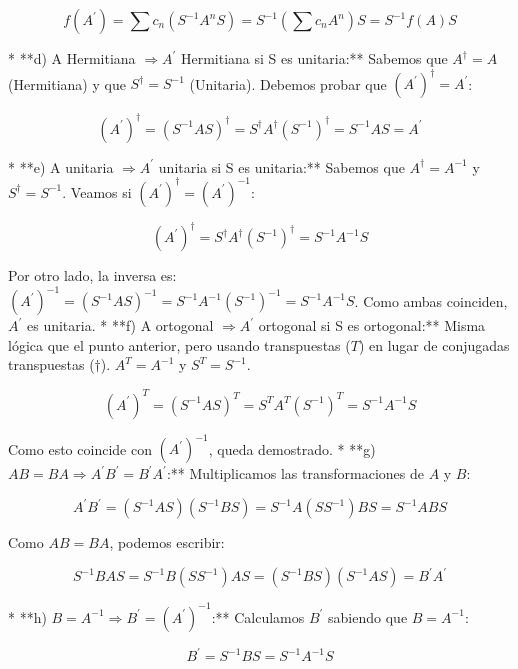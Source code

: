 \documentclass[11pt,spanish]{article}
\begin{document}
$$f(A^{\prime}) = \sum c_n (S^{-1} A^n S) = S^{-1} \left( \sum c_n A^n \right) S = S^{-1} f(A) S$$


* 
**d) A Hermitiana $\Rightarrow A^{\prime}$ Hermitiana si S es unitaria:** 
Sabemos que $A^{\dagger} = A$ (Hermitiana) y que $S^{\dagger} = S^{-1}$ (Unitaria). Debemos probar que $(A^{\prime})^{\dagger} = A^{\prime}$:



$$(A^{\prime})^{\dagger} = (S^{-1} A S)^{\dagger} = S^{\dagger} A^{\dagger} (S^{-1})^{\dagger} = S^{-1} A S = A^{\prime}$$


* 
**e) A unitaria $\Rightarrow A^{\prime}$ unitaria si S es unitaria:** 
Sabemos que $A^{\dagger} = A^{-1}$ y $S^{\dagger} = S^{-1}$. Veamos si $(A^{\prime})^{\dagger} = (A^{\prime})^{-1}$:



$$(A^{\prime})^{\dagger} = S^{\dagger} A^{\dagger} (S^{-1})^{\dagger} = S^{-1} A^{-1} S$$



Por otro lado, la inversa es: $(A^{\prime})^{-1} = (S^{-1} A S)^{-1} = S^{-1} A^{-1} (S^{-1})^{-1} = S^{-1} A^{-1} S$. Como ambas coinciden, $A^{\prime}$ es unitaria.
* 
**f) A ortogonal $\Rightarrow A^{\prime}$ ortogonal si S es ortogonal:** 
Misma lógica que el punto anterior, pero usando transpuestas ($T$) en lugar de conjugadas transpuestas ($\dagger$). $A^T = A^{-1}$ y $S^T = S^{-1}$.



$$(A^{\prime})^T = (S^{-1} A S)^T = S^T A^T (S^{-1})^T = S^{-1} A^{-1} S$$



Como esto coincide con $(A^{\prime})^{-1}$, queda demostrado.
* 
**g) $AB = BA \Rightarrow A^{\prime}B^{\prime} = B^{\prime}A^{\prime}$:** 
Multiplicamos las transformaciones de $A$ y $B$:



$$A^{\prime}B^{\prime} = (S^{-1} A S) (S^{-1} B S) = S^{-1} A (S S^{-1}) B S = S^{-1} A B S$$



Como $AB = BA$, podemos escribir:

$$S^{-1} B A S = S^{-1} B (S S^{-1}) A S = (S^{-1} B S) (S^{-1} A S) = B^{\prime}A^{\prime}$$


* 
**h) $B = A^{-1} \Rightarrow B^{\prime} = (A^{\prime})^{-1}$:** 
Calculamos $B^{\prime}$ sabiendo que $B = A^{-1}$:



$$B^{\prime} = S^{-1} B S = S^{-1} A^{-1} S$$
\end{document}

